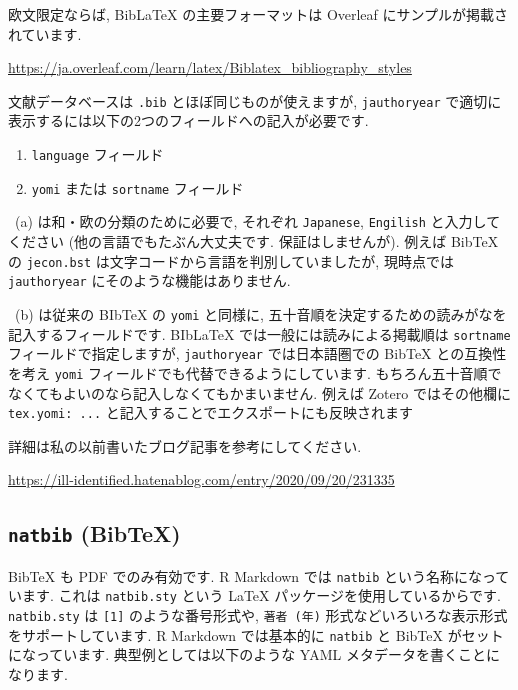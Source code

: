 \documentclass[
]{bxjsarticle}
\providecommand{\tightlist}{%
  \setlength{\itemsep}{0pt}\setlength{\parskip}{0pt}}
\begin{document}
欧文限定ならば, BibLaTeX の主要フォーマットは Overleaf にサンプルが掲載されています.

\url{https://ja.overleaf.com/learn/latex/Biblatex_bibliography_styles}

文献データベースは \texttt{.bib} とほぼ同じものが使えますが, \texttt{jauthoryear} で適切に表示するには以下の2つのフィールドへの記入が必要です.

\begin{enumerate}
\def\labelenumi{\alph{enumi}.}
\tightlist
\item
  \texttt{language} フィールド
\item
  \texttt{yomi} または \texttt{sortname} フィールド
\end{enumerate}

~(a) は和・欧の分類のために必要で, それぞれ \texttt{Japanese}, \texttt{Engilish} と入力してください (他の言語でもたぶん大丈夫です. 保証はしませんが). 例えば BibTeX の \texttt{jecon.bst} は文字コードから言語を判別していましたが, 現時点では \texttt{jauthoryear} にそのような機能はありません.

~(b) は従来の BIbTeX の \texttt{yomi} と同様に, 五十音順を決定するための読みがなを記入するフィールドです. BIbLaTeX では一般には読みによる掲載順は \texttt{sortname} フィールドで指定しますが, \texttt{jauthoryear} では日本語圏での BibTeX との互換性を考え \texttt{yomi} フィールドでも代替できるようにしています. もちろん五十音順でなくてもよいのなら記入しなくてもかまいません. 例えば Zotero ではその他欄に \texttt{tex.yomi:\ ...} と記入することでエクスポートにも反映されます

詳細は私の以前書いたブログ記事を参考にしてください.

\url{https://ill-identified.hatenablog.com/entry/2020/09/20/231335}

\hypertarget{natbib-bibtex}{%
\subsection{\texorpdfstring{\texttt{natbib} (BibTeX)}{natbib (BibTeX)}}\label{natbib-bibtex}}

BibTeX も PDF でのみ有効です. R Markdown では \texttt{natbib} という名称になっています. これは \texttt{natbib.sty} という LaTeX パッケージを使用しているからです. \texttt{natbib.sty} は \texttt{{[}1{]}} のような番号形式や, \texttt{著者\ (年)} 形式などいろいろな表示形式をサポートしています. R Markdown では基本的に \texttt{natbib} と BibTeX がセットになっています. 典型例としては以下のような YAML メタデータを書くことになります.
\end{document}
